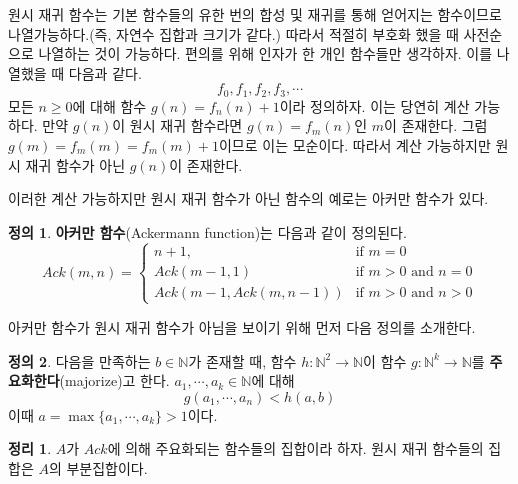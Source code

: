 \documentclass[b5paper]{book}
\theoremstyle{definition}
\newtheorem{defn}{정의}[chapter]
\newtheorem{thm}{정리}[chapter]
\newenvironment{pf*}{\pushQED{\qed}\pf}{\popQED\endpf}
\begin{document}
\begin{pf*}
원시 재귀 함수는 기본 함수들의 유한 번의 합성 및 재귀를 통해 얻어지는 함수이므로 나열가능하다.(즉, 자연수 집합과
크기가 같다.) 따라서 적절히 부호화 했을 때 사전순으로 나열하는 것이 가능하다. 편의를 위해 인자가 한 개인
함수들만 생각하자. 이를 나열했을 때 다음과 같다.
$$f_0, f_1, f_2, f_3, \cdots $$
모든 $n \ge 0$에 대해 함수 $g(n) = f_n (n) +  1$이라 정의하자. 이는 당연히 계산 가능하다.
만약 $g(n)$이 원시 재귀 함수라면 $g(n) = f_m(n)$인 $m$이 존재한다.  
그럼 $g(m) = f_m(m) = f_m(m) + 1$이므로 이는 모순이다. 따라서 계산 가능하지만 원시 재귀 함수가 아닌
$g(n)$이 존재한다. 
\end{pf*}
이러한 계산 가능하지만 원시 재귀 함수가 아닌 함수의 예로는 아커만 함수가 있다.
\begin{defn}
    \textbf{아커만 함수}(Ackermann function)는 다음과 같이 정의된다. 
    $$Ack(m,n) = \begin{cases}
        n+1, & \text{if } m = 0 \\ 
        Ack(m-1, 1) & \text{if } m > 0 \text{ and } n = 0 \\ 
        Ack(m-1, Ack(m, n-1)) & \text{if } m>0 \text{ and } n > 0 
    \end{cases} $$
\end{defn}
아커만 함수가 원시 재귀 함수가 아님을 보이기 위해 먼저 다음 정의를 소개한다.
\begin{defn}
    다음을 만족하는 $b\in \mathbb{N}$가 존재할 때, 함수 $h:\mathbb{N}^2 \rightarrow \mathbb{N}$이 
    함수 $g:\mathbb{N}^k\rightarrow \mathbb{N}$를
    \textbf{주요화한다}(majorize)고 한다. $a_1, \cdots, a_k \in \mathbb{N}$에 대해
    $$g(a_1, \cdots, a_n) < h(a, b)$$
    이때 $a = \max{\{a_1, \cdots, a_k\}} > 1$이다. 
\end{defn} 
\begin{thm} \label{forack}
    $A$가 $Ack$에 의해 주요화되는 함수들의 집합이라 하자. 원시 재귀 함수들의 집합은 $A$의 부분집합이다.
\end{thm}
\end{document}
